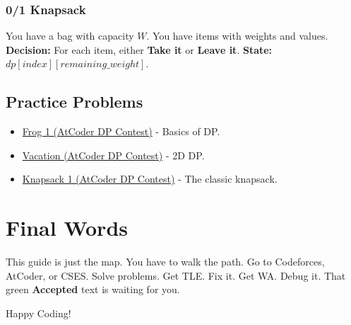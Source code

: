 \documentclass[12pt, a4paper]{report}
\begin{document}
\subsection{0/1 Knapsack}
You have a bag with capacity $W$. You have items with weights and values.
\textbf{Decision:} For each item, either \textbf{Take it} or \textbf{Leave it}.
\textbf{State:} $dp[index][remaining\_weight]$.

\section{Practice Problems}
\begin{itemize}
    \item \href{https://atcoder.jp/contests/dp/tasks/dp_a}{Frog 1 (AtCoder DP Contest)} - Basics of DP.
    \item \href{https://atcoder.jp/contests/dp/tasks/dp_c}{Vacation (AtCoder DP Contest)} - 2D DP.
    \item \href{https://atcoder.jp/contests/dp/tasks/dp_d}{Knapsack 1 (AtCoder DP Contest)} - The classic knapsack.
\end{itemize}

\chapter*{Final Words}
This guide is just the map. You have to walk the path.
Go to Codeforces, AtCoder, or CSES. Solve problems. Get TLE. Fix it. Get WA. Debug it.
That green \textbf{Accepted} text is waiting for you.

Happy Coding!
\end{document}
